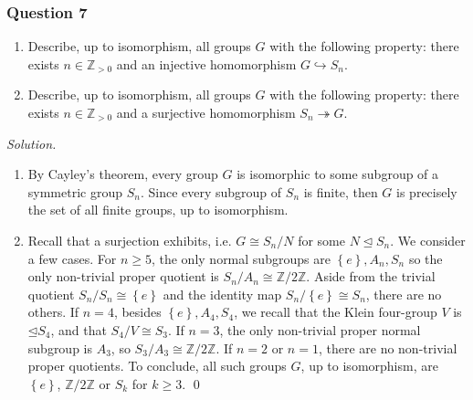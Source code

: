 \documentclass[12pt]{article}
\begin{document}
\subsubsection*{Question 7}
\begin{enumerate}[label=\textbf{(\alph*)}]
    \itemsep 0em
    \item Describe, up to isomorphism, all groups $G$ with the following property: there exists $n\in\mathbb{Z}_{>0}$ and an injective homomorphism $G\hookrightarrow S_n$.
\item Describe, up to isomorphism, all groups $G$ with the following property: there exists $n\in\mathbb{Z}_{>0}$ and a surjective homomorphism $S_n\twoheadrightarrow G$.
\end{enumerate}
\noindent\emph{Solution.}
\begin{enumerate}[label=\textbf{(\alph*)}]
    \itemsep 0em
    \item By Cayley's theorem, every group $G$ is isomorphic to some subgroup of a symmetric group $S_n$. Since every subgroup of $S_n$ is finite, then $G$ is precisely the set of all finite groups, up to isomorphism.
    \item Recall that a surjection exhibits, i.e. $G\cong S_n/N$ for some $N\unlhd S_n$. We consider a few cases.
    \newline
    \newline For $n\ge 5$, the only normal subgroups are $\left\{e\right\},A_n,S_n$ so the only non-trivial proper quotient is $S_n/A_n\cong \mathbb{Z}/2\mathbb{Z}$. Aside from the trivial quotient $S_n/S_n\cong \left\{e\right\}$ and the identity map $S_n/\left\{e\right\}\cong S_n$, there are no others.
    \newline
    \newline If $n=4$, besides $\left\{e\right\},A_4,S_4$, we recall that the Klein four-group $V$ is $\unlhd S_4$, and that $S_4/V\cong S_3$. If $n=3$, the only non-trivial proper normal subgroup is $A_3$, so $S_3/A_3\cong \mathbb{Z}/2\mathbb{Z}$. If $n=2$ or $n=1$, there are no non-trivial proper quotients.
    \newline
    \newline To conclude, all such groups $G$, up to isomorphism, are $\left\{e\right\}$, $\mathbb{Z}/2\mathbb{Z}$ or $S_k$ for $k\ge 3$. \qed 
\end{enumerate}
\end{document}
